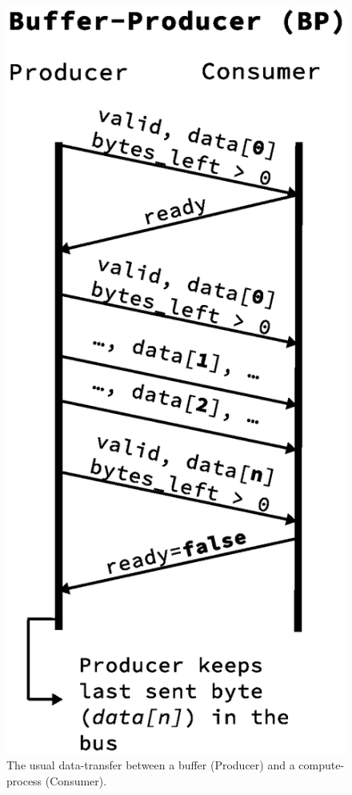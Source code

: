 \begin{figure}
	\centering
	\includegraphics[scale=0.5]{implementation/buffer_producer.eps}
	\caption{The usual data-transfer between a buffer (Producer) and a
	compute-process (Consumer).}
	\label{fig:buffer_producer}
\end{figure}




